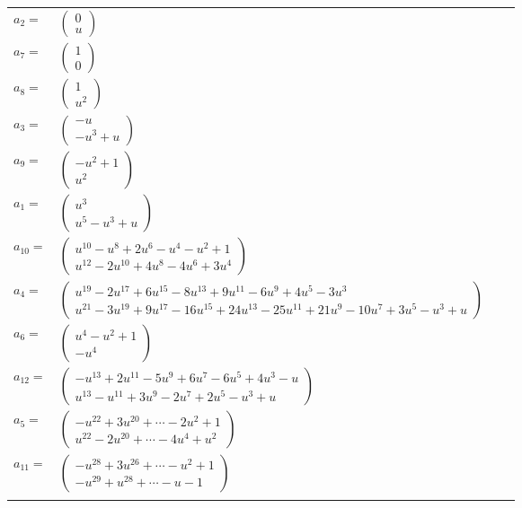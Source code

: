 \documentclass[1p]{elsarticle_modified}
\theoremstyle{definition}
\begin{document}
\begin{tabular}{m{7pt} m{180pt} m{7pt} m{180pt} }
\flushright $a_{2}=$&$\begin{pmatrix}0\\u\end{pmatrix}$ \\
\flushright $a_{7}=$&$\begin{pmatrix}1\\0\end{pmatrix}$ \\
\flushright $a_{8}=$&$\begin{pmatrix}1\\u^2\end{pmatrix}$ \\
\flushright $a_{3}=$&$\begin{pmatrix}- u\\- u^3+u\end{pmatrix}$ \\
\flushright $a_{9}=$&$\begin{pmatrix}- u^2+1\\u^2\end{pmatrix}$ \\
\flushright $a_{1}=$&$\begin{pmatrix}u^3\\u^5- u^3+u\end{pmatrix}$ \\
\flushright $a_{10}=$&$\begin{pmatrix}u^{10}- u^8+2 u^6- u^4- u^2+1\\u^{12}-2 u^{10}+4 u^8-4 u^6+3 u^4\end{pmatrix}$ \\
\flushright $a_{4}=$&$\begin{pmatrix}u^{19}-2 u^{17}+6 u^{15}-8 u^{13}+9 u^{11}-6 u^9+4 u^5-3 u^3\\u^{21}-3 u^{19}+9 u^{17}-16 u^{15}+24 u^{13}-25 u^{11}+21 u^9-10 u^7+3 u^5- u^3+u\end{pmatrix}$ \\
\flushright $a_{6}=$&$\begin{pmatrix}u^4- u^2+1\\- u^4\end{pmatrix}$ \\
\flushright $a_{12}=$&$\begin{pmatrix}- u^{13}+2 u^{11}-5 u^9+6 u^7-6 u^5+4 u^3- u\\u^{13}- u^{11}+3 u^9-2 u^7+2 u^5- u^3+u\end{pmatrix}$ \\
\flushright $a_{5}=$&$\begin{pmatrix}- u^{22}+3 u^{20}+\cdots-2 u^2+1\\u^{22}-2 u^{20}+\cdots-4 u^4+u^2\end{pmatrix}$ \\
\flushright $a_{11}=$&$\begin{pmatrix}- u^{28}+3 u^{26}+\cdots- u^2+1\\- u^{29}+u^{28}+\cdots- u-1\end{pmatrix}$\\&\end{tabular}
\end{document}
